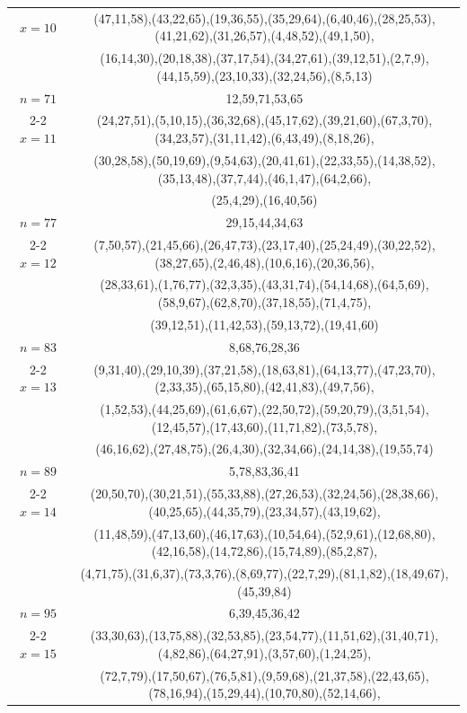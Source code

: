 \begin{tabular}{| c | c |}
\(x=10\)
&(47,11,58),(43,22,65),(19,36,55),(35,29,64),(6,40,46),(28,25,53),(41,21,62),(31,26,57),(4,48,52),(49,1,50),\\
&(16,14,30),(20,18,38),(37,17,54),(34,27,61),(39,12,51),(2,7,9),(44,15,59),(23,10,33),(32,24,56),(8,5,13)\\
\hline 
\(n=71\) & 
12,59,71,53,65\\
\cline{2-2}
\(x=11\)
&(24,27,51),(5,10,15),(36,32,68),(45,17,62),(39,21,60),(67,3,70),(34,23,57),(31,11,42),(6,43,49),(8,18,26),\\
&(30,28,58),(50,19,69),(9,54,63),(20,41,61),(22,33,55),(14,38,52),(35,13,48),(37,7,44),(46,1,47),(64,2,66),\\
&(25,4,29),(16,40,56)\\
\hline 
\(n=77\) & 
29,15,44,34,63\\
\cline{2-2}
\(x=12\)
&(7,50,57),(21,45,66),(26,47,73),(23,17,40),(25,24,49),(30,22,52),(38,27,65),(2,46,48),(10,6,16),(20,36,56),\\
&(28,33,61),(1,76,77),(32,3,35),(43,31,74),(54,14,68),(64,5,69),(58,9,67),(62,8,70),(37,18,55),(71,4,75),\\
&(39,12,51),(11,42,53),(59,13,72),(19,41,60)\\
\hline 
\(n=83\) & 
8,68,76,28,36\\
\cline{2-2}
\(x=13\)
&(9,31,40),(29,10,39),(37,21,58),(18,63,81),(64,13,77),(47,23,70),(2,33,35),(65,15,80),(42,41,83),(49,7,56),\\
&(1,52,53),(44,25,69),(61,6,67),(22,50,72),(59,20,79),(3,51,54),(12,45,57),(17,43,60),(11,71,82),(73,5,78),\\
&(46,16,62),(27,48,75),(26,4,30),(32,34,66),(24,14,38),(19,55,74)\\
\hline 
\(n=89\) & 
5,78,83,36,41\\
\cline{2-2}
\(x=14\)
&(20,50,70),(30,21,51),(55,33,88),(27,26,53),(32,24,56),(28,38,66),(40,25,65),(44,35,79),(23,34,57),(43,19,62),\\
&(11,48,59),(47,13,60),(46,17,63),(10,54,64),(52,9,61),(12,68,80),(42,16,58),(14,72,86),(15,74,89),(85,2,87),\\
&(4,71,75),(31,6,37),(73,3,76),(8,69,77),(22,7,29),(81,1,82),(18,49,67),(45,39,84)\\
\hline 
\(n=95\) & 
6,39,45,36,42\\
\cline{2-2}
\(x=15\)
&(33,30,63),(13,75,88),(32,53,85),(23,54,77),(11,51,62),(31,40,71),(4,82,86),(64,27,91),(3,57,60),(1,24,25),\\
&(72,7,79),(17,50,67),(76,5,81),(9,59,68),(21,37,58),(22,43,65),(78,16,94),(15,29,44),(10,70,80),(52,14,66),\\

\end{tabular}
